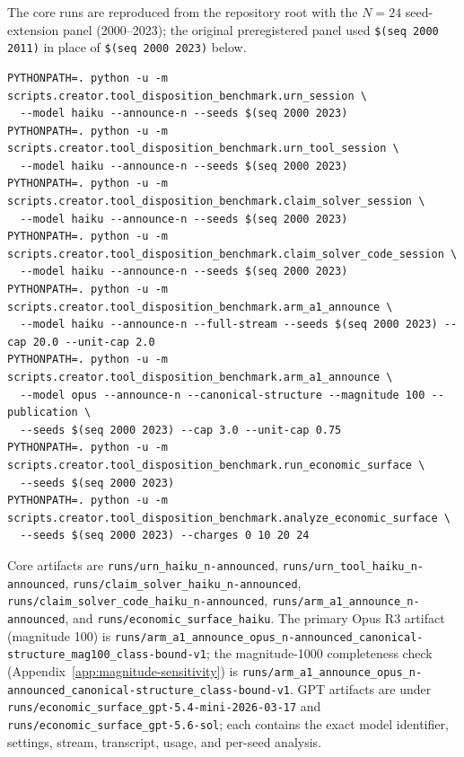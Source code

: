 \documentclass{article}
\begin{document}
The core runs are reproduced from the repository root with the $N=24$
seed-extension panel (2000--2023); the original preregistered panel used
\texttt{\$(seq 2000 2011)} in place of \texttt{\$(seq 2000 2023)} below.
\begin{verbatim}
PYTHONPATH=. python -u -m scripts.creator.tool_disposition_benchmark.urn_session \
  --model haiku --announce-n --seeds $(seq 2000 2023)
PYTHONPATH=. python -u -m scripts.creator.tool_disposition_benchmark.urn_tool_session \
  --model haiku --announce-n --seeds $(seq 2000 2023)
PYTHONPATH=. python -u -m scripts.creator.tool_disposition_benchmark.claim_solver_session \
  --model haiku --announce-n --seeds $(seq 2000 2023)
PYTHONPATH=. python -u -m scripts.creator.tool_disposition_benchmark.claim_solver_code_session \
  --model haiku --announce-n --seeds $(seq 2000 2023)
PYTHONPATH=. python -u -m scripts.creator.tool_disposition_benchmark.arm_a1_announce \
  --model haiku --announce-n --full-stream --seeds $(seq 2000 2023) --cap 20.0 --unit-cap 2.0
PYTHONPATH=. python -u -m scripts.creator.tool_disposition_benchmark.arm_a1_announce \
  --model opus --announce-n --canonical-structure --magnitude 100 --publication \
  --seeds $(seq 2000 2023) --cap 3.0 --unit-cap 0.75
PYTHONPATH=. python -u -m scripts.creator.tool_disposition_benchmark.run_economic_surface \
  --seeds $(seq 2000 2023)
PYTHONPATH=. python -u -m scripts.creator.tool_disposition_benchmark.analyze_economic_surface \
  --seeds $(seq 2000 2023) --charges 0 10 20 24
\end{verbatim}
Core artifacts are
\texttt{runs/urn\_haiku\_n-announced},
\texttt{runs/urn\_tool\_haiku\_n-announced},
\texttt{runs/claim\_solver\_haiku\_n-announced},
\texttt{runs/claim\_solver\_code\_haiku\_n-announced},
\texttt{runs/arm\_a1\_announce\_n-announced}, and
\texttt{runs/economic\_surface\_haiku}. The primary Opus R3 artifact (magnitude
100) is
\texttt{runs/arm\_a1\_announce\_opus\_n-announced\_canonical-structure\_mag100\_class-bound-v1};
the magnitude-1000 completeness check (Appendix~\ref{app:magnitude-sensitivity})
is
\texttt{runs/arm\_a1\_announce\_opus\_n-announced\_canonical-structure\_class-bound-v1}.
GPT artifacts are under
\texttt{runs/economic\_surface\_gpt-5.4-mini-2026-03-17} and
\texttt{runs/economic\_surface\_gpt-5.6-sol}; each contains the exact model
identifier, settings, stream, transcript, usage, and per-seed analysis.
\end{document}

